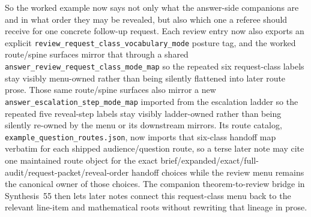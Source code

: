 \documentclass[11pt]{article}
\begin{document}
So the worked example now says not only what the answer-side companions are and in what order they may be revealed, but also which one a referee should receive for one concrete follow-up request. Each review entry now also exports an explicit \nolinkurl{review_request_class_vocabulary_mode} posture tag, and the worked route/spine surfaces mirror that through a shared \nolinkurl{answer_review_request_class_mode_map} so the repeated six request-class labels stay visibly menu-owned rather than being silently flattened into later route prose. Those same route/spine surfaces also mirror a new \nolinkurl{answer_escalation_step_mode_map} imported from the escalation ladder so the repeated five reveal-step labels stay visibly ladder-owned rather than being silently re-owned by the menu or its downstream mirrors. Its route catalog, \nolinkurl{example_question_routes.json}, now imports that six-class handoff map verbatim for each shipped audience/question route, so a terse later note may cite one maintained route object for the exact brief/expanded/exact/full-audit/request-packet/reveal-order handoff choices while the review menu remains the canonical owner of those choices. The companion theorem-to-review bridge in Synthesis~55 then lets later notes connect this request-class menu back to the relevant line-item and mathematical roots without rewriting that lineage in prose.\cite{series:seriesspines}
\end{document}
